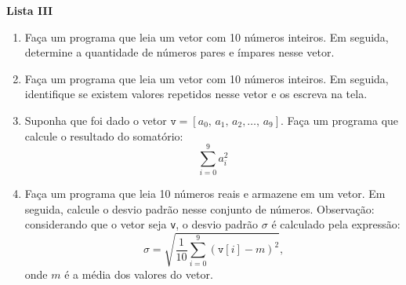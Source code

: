 \documentclass[12pt,a4paper]{article}
\begin{document}
\begin{center}
  \textbf{Lista III}
\end{center}

\begin{enumerate}
%
%  
%  
%
%  
%  
  \item Faça um programa que leia um vetor com 10 números inteiros.
  Em seguida, determine a quantidade de números pares e ímpares
  nesse vetor.

  \item Faça um programa que leia um vetor com 10 números inteiros.
  Em seguida, identifique se existem valores repetidos nesse vetor
  e os escreva na tela.
  
  \item Suponha que foi dado o vetor $\texttt{v} = [a_0,\, a_1,\, a_2, \ldots,\, a_{9}]$.
  Faça um programa que calcule o resultado do somatório:
  $$\sum_{i = 0}^9 a_i^2$$
  
  \item Faça um programa que leia 10 números reais e armazene em um vetor.
  Em seguida, calcule o desvio padrão nesse conjunto de números. Observação:
  considerando que o vetor seja \texttt{v}, o desvio padrão $\sigma$ é 
  calculado pela expressão:
  $$\sigma = \sqrt{\frac{1}{10} \sum_{i = 0}^9 (\texttt{v}[i] - m)^2}\textrm{,}$$
  onde $m$ é a média dos valores do vetor.
\end{enumerate}
\end{document}
